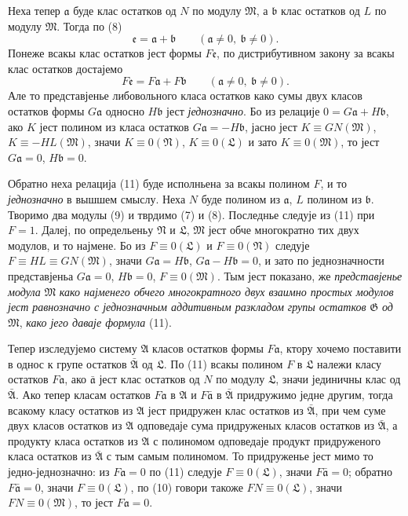 ﻿\documentclass[11pt]{article}
\providecommand{\mM}{\mathfrak M}
\providecommand{\mN}{\mathfrak N}
\providecommand{\mL}{\mathfrak L}
\providecommand{\mG}{\mathfrak G}
\providecommand{\mA}{\mathfrak A}
\providecommand{\mbarA}{\bar{\mathfrak A}}
\providecommand{\ma}{\mathfrak a}
\providecommand{\mb}{\mathfrak b}
\providecommand{\me}{\mathfrak e}
\providecommand{\bara}{\bar{\mathfrak a}}
\begin{document}
Неха тепер \(\ma\) буде клас остатков од \(N\) по модулу \(\mM\), а \(\mb\) клас остатков од \(L\) по модулу \(\mM\). Тогда по (8)
\[
 \me=\ma+\mb\qquad(\ma\ne0,\ \mb\ne0).
\]
Понеже всакы клас остатков јест формы \(F\me\), по дистрибутивном закону за всакы клас остатков достајемо
\begin{equation}
 F\me=F\ma+F\mb\qquad(\ma\ne0,\ \mb\ne0).
\tag{11}
\end{equation}
Але то представјенье либовольного класа остатков како сумы двух класов остатков формы \(G\ma\) односно \(H\mb\) јест \textit{једнозначно}. Бо из релације \(0=G\ma+H\mb\), ако \(K\) јест полином из класа остатков \(G\ma=-H\mb\), јасно јест \(K\equiv GN(\mM)\), \(K\equiv-HL(\mM)\), значи \(K\equiv0(\mN)\), \(K\equiv0(\mL)\) и зато \(K\equiv0(\mM)\), то јест \(G\ma=0\), \(H\mb=0\).

Обратно неха релација (11) буде исполньена за всакы полином \(F\), и то \textit{једнозначно} в вышшем смыслу. Неха \(N\) буде полином из \(\ma\), \(L\) полином из \(\mb\). Творимо два модулы (9) и тврдимо (7) и (8). Последнье следује из (11) при \(F=1\). Далеј, по определьеньу \(\mN\) и \(\mL\), \(\mM\) јест обче многократно тих двух модулов, и то најмене. Бо из \(F\equiv0(\mL)\) и \(F\equiv0(\mN)\) следује \(F\equiv HL\equiv GN(\mM)\), значи \(G\ma=H\mb\), \(G\ma-H\mb=0\), и зато по једнозначности представјеньа \(G\ma=0\), \(H\mb=0\), \(F\equiv0(\mM)\). Тым јест показано, же \textit{представјенье модула} \(\mM\) \textit{како најменего обчего многократного двух взаимно простых модулов јест равнозначно с једнозначным аддитивным разкладом групы остатков} \(\mG\) \textit{од} \(\mM\), \textit{како јего даваје формула} (11).

Тепер изследујемо систему \(\mA\) класов остатков формы \(F\ma\), ктору хочемо поставити в однос к групе остатков \(\mbarA\) од \(\mL\). По (11) всакы полином \(F\) в \(\mL\) належи класу остатков \(F\ma\), ако \(\bara\) јест клас остатков од \(N\) по модулу \(\mL\), значи јединичны клас од \(\mbarA\). Ако тепер класам остатков \(F\ma\) в \(\mA\) и \(F\bara\) в \(\mbarA\) придружимо једне другим, тогда всакому класу остатков из \(\mA\) јест придружен клас остатков из \(\mbarA\), при чем суме двух класов остатков из \(\mA\) одповедаје сума придруженых класов остатков из \(\mbarA\), а продукту класа остатков из \(\mA\) с полиномом одповедаје продукт придруженого класа остатков из \(\mbarA\) с тым самым полиномом. То придруженье јест мимо то једно-једнозначно: из \(F\ma=0\) по (11) следује \(F\equiv0(\mL)\), значи \(F\bara=0\); обратно \(F\bara=0\), значи \(F\equiv0(\mL)\), по (10) говори такоже \(FN\equiv0(\mL)\), значи \(FN\equiv0(\mM)\), то јест \(F\ma=0\).
\end{document}

